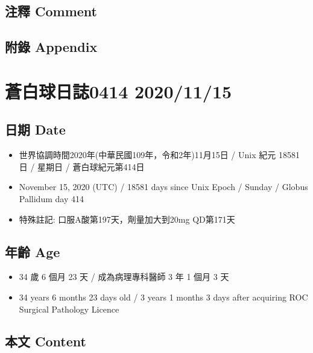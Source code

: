 \documentclass[
]{article}
\providecommand{\tightlist}{%
  \setlength{\itemsep}{0pt}\setlength{\parskip}{0pt}}
\begin{document}
\hypertarget{ux6ce8ux91cb-comment-68}{%
\subsection{注釋 Comment}\label{ux6ce8ux91cb-comment-68}}

\hypertarget{ux9644ux9304-appendix-68}{%
\subsection{附錄 Appendix}\label{ux9644ux9304-appendix-68}}

\hypertarget{ux84bcux767dux7403ux65e5ux8a8c0414-20201115}{%
\section{蒼白球日誌0414
2020/11/15}\label{ux84bcux767dux7403ux65e5ux8a8c0414-20201115}}

\hypertarget{ux65e5ux671f-date-69}{%
\subsection{日期 Date}\label{ux65e5ux671f-date-69}}

\begin{itemize}
\tightlist
\item
  世界協調時間2020年(中華民國109年，令和2年)11月15日 / Unix 紀元 18581
  日 / 星期日 / 蒼白球紀元第414日
\item
  November 15, 2020 (UTC) / 18581 days since Unix Epoch / Sunday /
  Globus Pallidum day 414
\item
  特殊註記: 口服A酸第197天，劑量加大到20mg QD第171天
\end{itemize}

\hypertarget{ux5e74ux9f61-age-69}{%
\subsection{年齡 Age}\label{ux5e74ux9f61-age-69}}

\begin{itemize}
\tightlist
\item
  34 歲 6 個月 23 天 / 成為病理專科醫師 3 年 1 個月 3 天
\item
  34 years 6 months 23 days old / 3 years 1 months 3 days after
  acquiring ROC Surgical Pathology Licence
\end{itemize}

\hypertarget{ux672cux6587-content-69}{%
\subsection{本文 Content}\label{ux672cux6587-content-69}}
\end{document}
